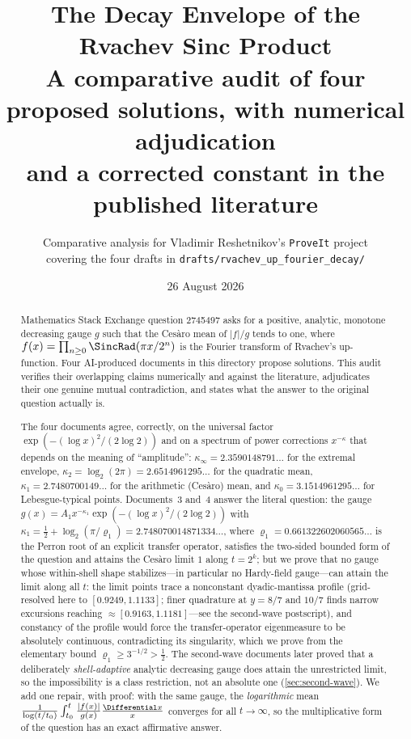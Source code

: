 \documentclass[11pt,oneside]{article}
\title{\bfseries The Decay Envelope of the Rvachev Sinc Product\\[0.35em]
\large A comparative audit of four proposed solutions, with numerical adjudication\\
and a corrected constant in the published literature}
\author{Comparative analysis for Vladimir Reshetnikov's \texttt{ProveIt} project\\
\small covering the four drafts in \nolinkurl{drafts/rvachev_up_fourier_decay/}}
\date{26 August 2026}
\theoremstyle{definition}
\theoremstyle{remark}
\begin{document}
\maketitle

\begin{abstract}
Mathematics Stack Exchange question 2745497 asks for a positive, analytic,
monotone decreasing gauge $g$ such that the Ces\`aro mean of $|f|/g$ tends to
one, where $f(x)=\prod_{n\ge0}\SincRad(\pi x/2^n)$ is the Fourier transform of
Rvachev's up-function.  Four AI-produced documents in this directory propose
solutions.  This audit verifies their overlapping claims numerically and
against the literature, adjudicates their one genuine mutual contradiction,
and states what the answer to the original question actually is.

The four documents agree, correctly, on the universal factor
$\exp(-(\log x)^2/(2\log2))$ and on a spectrum of power corrections
$x^{-\kappa}$ that depends on the meaning of ``amplitude'':
$\kappa_\infty=2.3590148791\ldots$ for the extremal envelope,
$\kappa_2=\log_2(2\pi)=2.6514961295\ldots$ for the quadratic mean,
$\kappa_1=2.7480700149\ldots$ for the arithmetic (Ces\`aro) mean, and
$\kappa_0=3.1514961295\ldots$ for Lebesgue-typical points.  Documents~3
and~4 answer the literal question: the gauge
$g(x)=A_1x^{-\kappa_1}\exp(-(\log x)^2/(2\log2))$ with
$\kappa_1=\tfrac12+\log_2(\pi/\varrho_1)=2.748070014871334\ldots$, where
$\varrho_1=0.661322602060565\ldots$ is the Perron root of an explicit
transfer operator, satisfies the two-sided bounded form of the question and
attains the Ces\`aro limit $1$ along $t=2^k$; but we prove that no gauge
whose within-shell shape stabilizes---in particular no Hardy-field
gauge---can attain the limit along all $t$: the limit
points trace a nonconstant dyadic-mantissa profile (grid-resolved here to
$[0.9249,1.1133]$; finer quadrature at $y=8/7$ and $10/7$ finds narrow
excursions reaching $\approx[0.9163,1.1181]$---see the second-wave
postscript), and constancy of the profile would force the
transfer-operator eigenmeasure to be absolutely continuous, contradicting
its singularity, which we prove from the elementary bound
$\varrho_1\ge3^{-1/2}>\tfrac12$.  The second-wave documents later proved
that a deliberately \emph{shell-adaptive} analytic decreasing gauge does
attain the unrestricted limit, so the impossibility is a class
restriction, not an absolute one (\cref{sec:second-wave}).  We add one repair, with proof: with the
same gauge, the \emph{logarithmic} mean
$\frac{1}{\log(t/t_0)}\int_{t_0}^t\frac{|f(x)|}{g(x)}\frac{\Differential x}{x}$
converges for all $t\to\infty$, so the multiplicative form of the question
has an exact affirmative answer.


\end{abstract}
\end{document}

